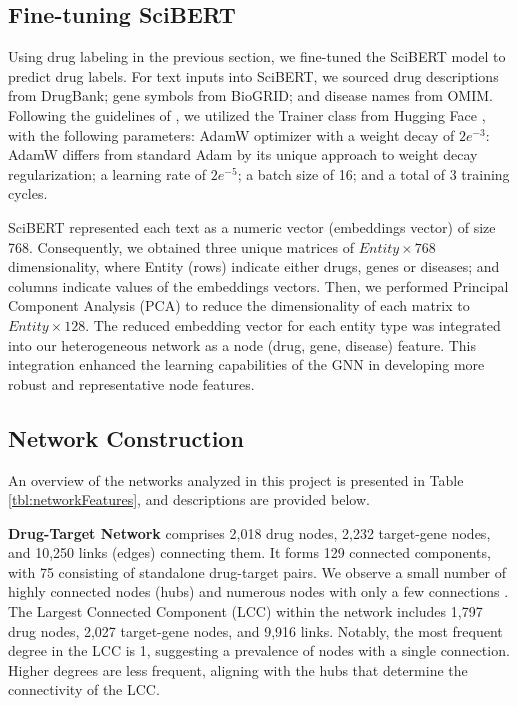 \documentclass[journal,twoside,web]{ieeecolor}
\begin{document}
\subsection{Fine-tuning SciBERT}
Using drug labeling in the previous section, we fine-tuned the SciBERT model to predict drug labels.
For text inputs into SciBERT, we sourced drug descriptions from DrugBank; gene symbols from BioGRID; and disease names from OMIM.
Following the guidelines of \cite{devlin-etal-2019-bert}, we utilized the Trainer class from Hugging Face \cite{wolf2019huggingface}, with the following parameters:
AdamW optimizer with a weight decay of  $2e^{-3}$:
AdamW differs from standard Adam by its unique approach to weight decay regularization; a learning rate of $2e^{-5}$; a batch size of 16; and a total of 3 training cycles.


SciBERT represented each text as a numeric vector (embeddings vector) of size 768.
Consequently, we obtained three unique matrices of $Entity \times 768$ dimensionality, where Entity (rows) indicate either drugs, genes or diseases; and columns indicate values of the embeddings vectors.
Then, we performed Principal Component Analysis (PCA) to reduce the dimensionality of each matrix to $Entity \times 128$.
The reduced embedding vector for each entity type was integrated into our heterogeneous network as a node (drug, gene, disease) feature.
This integration enhanced the learning capabilities of the GNN in developing more robust and representative node features.

\subsection{Network Construction}
\label{sec:network_construction_2}

An overview of the networks analyzed in this project is presented in Table \ref{tbl:networkFeatures}, and descriptions are provided below.

\textbf{Drug-Target Network}
comprises 2,018 drug nodes, 2,232 target-gene nodes, and 10,250 links (edges) connecting them.
It forms 129 connected components, with 75 consisting of standalone drug-target pairs.
We observe a small number of highly connected nodes (hubs) and numerous nodes with only a few connections \cite{barabasi2009scale}.
The Largest Connected Component (LCC) within the network includes 1,797 drug nodes, 2,027 target-gene nodes, and 9,916 links.
Notably, the most frequent degree in the LCC is 1, suggesting a prevalence of nodes with a single connection.
Higher degrees are less frequent, aligning with the hubs that determine the connectivity of the LCC.
\end{document}
